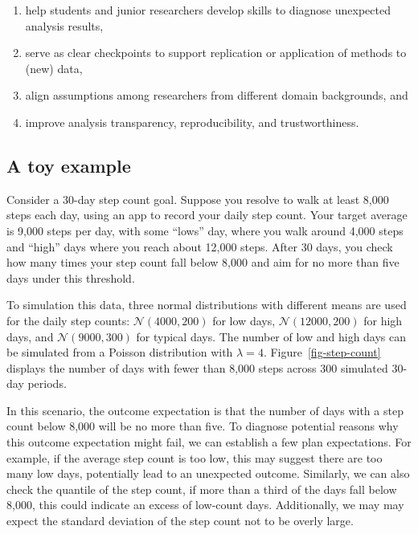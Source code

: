 \documentclass[
  12pt,
]{interact}
\providecommand{\tightlist}{%
  \setlength{\itemsep}{0pt}\setlength{\parskip}{0pt}}\usepackage{longtable,booktabs,array}
\begin{document}
\begin{enumerate}
\def\labelenumi{\arabic{enumi})}
\tightlist
\item
  help students and junior researchers develop skills to diagnose
  unexpected analysis results,
\item
  serve as clear checkpoints to support replication or application of
  methods to (new) data,
\item
  align assumptions among researchers from different domain backgrounds,
  and
\item
  improve analysis transparency, reproducibility, and trustworthiness.
\end{enumerate}

\subsection{A toy example}\label{a-toy-example}

Consider a 30-day step count goal. Suppose you resolve to walk at least
8,000 steps each day, using an app to record your daily step count. Your
target average is 9,000 steps per day, with some ``lows'' day, where you
walk around 4,000 steps and ``high'' days where you reach about 12,000
steps. After 30 days, you check how many times your step count fall
below 8,000 and aim for no more than five days under this threshold.

To simulation this data, three normal distributions with different means
are used for the daily step counts: \(\mathcal{N}(4000, 200)\) for low
days, \(\mathcal{N}(12000, 200)\) for high days, and
\(\mathcal{N}(9000, 300)\) for typical days. The number of low and high
days can be simulated from a Poisson distribution with \(\lambda = 4\).
Figure~\ref{fig-step-count} displays the number of days with fewer than
8,000 steps across 300 simulated 30-day periods.

In this scenario, the outcome expectation is that the number of days
with a step count below 8,000 will be no more than five. To diagnose
potential reasons why this outcome expectation might fail, we can
establish a few plan expectations. For example, if the average step
count is too low, this may suggest there are too many low days,
potentially lead to an unexpected outcome. Similarly, we can also check
the quantile of the step count, if more than a third of the days fall
below 8,000, this could indicate an excess of low-count days.
Additionally, we may may expect the standard deviation of the step count
not to be overly large.
\end{document}
